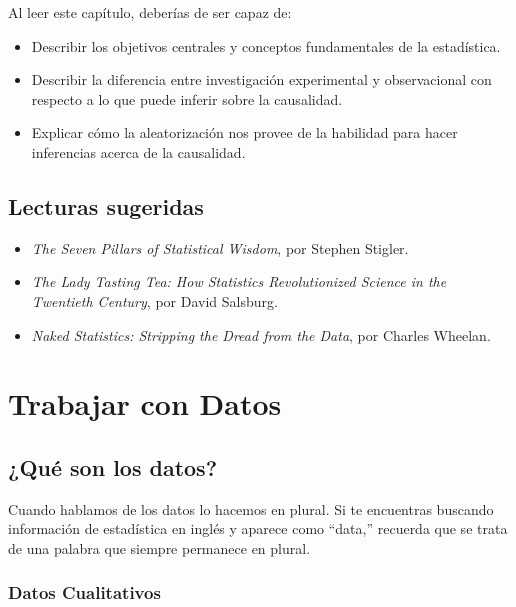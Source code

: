 \documentclass[
  12pt,
]{book}
\providecommand{\tightlist}{%
  \setlength{\itemsep}{0pt}\setlength{\parskip}{0pt}}
\begin{document}
Al leer este capítulo, deberías de ser capaz de:

\begin{itemize}
\tightlist
\item
  Describir los objetivos centrales y conceptos fundamentales de la estadística.
\item
  Describir la diferencia entre investigación experimental y observacional con respecto a lo que puede inferir sobre la causalidad.
\item
  Explicar cómo la aleatorización nos provee de la habilidad para hacer inferencias acerca de la causalidad.
\end{itemize}

\hypertarget{lecturas-sugeridas}{%
\section{Lecturas sugeridas}\label{lecturas-sugeridas}}

\begin{itemize}
\tightlist
\item
  \emph{The Seven Pillars of Statistical Wisdom}, por Stephen Stigler.
\item
  \emph{The Lady Tasting Tea: How Statistics Revolutionized Science in the Twentieth Century}, por David Salsburg.
\item
  \emph{Naked Statistics: Stripping the Dread from the Data}, por Charles Wheelan.
\end{itemize}

\hypertarget{working-with-data}{%
\chapter{Trabajar con Datos}\label{working-with-data}}

\hypertarget{quuxe9-son-los-datos}{%
\section{¿Qué son los datos?}\label{quuxe9-son-los-datos}}

Cuando hablamos de los datos lo hacemos en plural. Si te encuentras buscando información de estadística en inglés y aparece como ``data,'' recuerda que se trata de una palabra que siempre permanece en plural.

\hypertarget{datos-cualitativos}{%
\subsection{Datos Cualitativos}\label{datos-cualitativos}}
\end{document}
